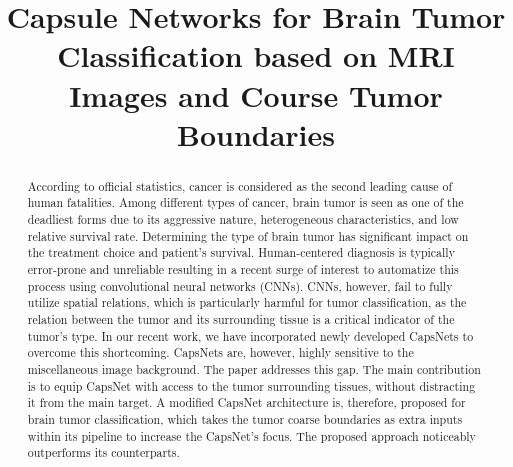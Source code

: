 \documentclass{article}
\title{Capsule Networks for Brain Tumor Classification based on MRI Images and Course Tumor Boundaries}
\begin{document}
\ninept
%
\maketitle
\begin{abstract}
According to official statistics, cancer is considered as the second leading cause of human fatalities. Among different types of cancer, brain tumor is seen as one of the deadliest forms due to its aggressive nature, heterogeneous characteristics, and low relative survival rate. Determining the type of brain tumor has significant impact on the treatment choice and patient's survival. Human-centered diagnosis is typically error-prone and unreliable resulting in a recent surge of interest to automatize this process using convolutional neural networks (CNNs). CNNs, however, fail to fully utilize spatial relations, which is particularly harmful for tumor classification, as the relation between the tumor and its surrounding tissue is a critical indicator of the tumor's type. In our recent work, we have incorporated newly developed CapsNets to overcome this shortcoming. CapsNets are, however, highly sensitive to the miscellaneous image background. The paper addresses this gap. The main contribution is to equip CapsNet with access to the tumor surrounding tissues, without distracting it from the main target. A modified CapsNet architecture is, therefore, proposed for brain tumor classification, which takes the tumor coarse boundaries as extra inputs within its pipeline to increase the CapsNet's focus. The proposed approach noticeably outperforms its counterparts.



\end{abstract}
\end{document}
